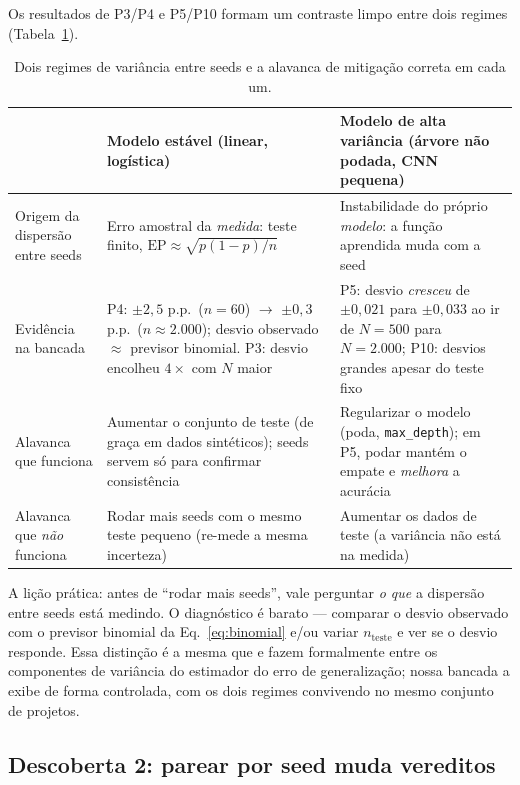 \documentclass[12pt]{article}
\begin{document}
Os resultados de P3/P4 e P5/P10 formam um contraste limpo entre dois regimes
(Tabela~\ref{tab:regimes}).

\begin{table}[htb]
\centering
\caption{Dois regimes de variância entre seeds e a alavanca de mitigação
correta em cada um.}
\label{tab:regimes}
\begin{tabular}{p{}p{}p{}}
\toprule
 & \textbf{Modelo estável} (linear, logística) & \textbf{Modelo de alta
variância} (árvore não podada, CNN pequena) \\
\midrule
Origem da dispersão entre seeds & Erro amostral da \emph{medida}: teste
finito, $\mathrm{EP} \approx \sqrt{p(1-p)/n}$ & Instabilidade do próprio
\emph{modelo}: a função aprendida muda com a seed \\
Evidência na bancada & P4: $\pm 2{,}5$ p.p.\ ($n{=}60$) $\to$ $\pm 0{,}3$
p.p.\ ($n{\approx}2.000$); desvio observado $\approx$ previsor binomial.
P3: desvio encolheu $4\times$ com $N$ maior & P5: desvio \emph{cresceu} de
$\pm 0{,}021$ para $\pm 0{,}033$ ao ir de $N{=}500$ para $N{=}2.000$;
P10: desvios grandes apesar do teste fixo \\
Alavanca que funciona & Aumentar o conjunto de teste (de graça em dados
sintéticos); seeds servem só para confirmar consistência & Regularizar o
modelo (poda, \texttt{max\_depth}); em P5, podar mantém o empate e
\emph{melhora} a acurácia \\
Alavanca que \emph{não} funciona & Rodar mais seeds com o mesmo teste pequeno
(re-mede a mesma incerteza) & Aumentar os dados de teste (a variância não
está na medida) \\
\bottomrule
\end{tabular}
\end{table}

A lição prática: antes de ``rodar mais seeds'', vale perguntar \emph{o que} a
dispersão entre seeds está medindo. O diagnóstico é barato --- comparar o
desvio observado com o previsor binomial da Eq.~\eqref{eq:binomial} e/ou
variar $n_{\text{teste}}$ e ver se o desvio responde. Essa distinção é a
mesma que \cite{nadeau2003} e \cite{bouthillier2021} fazem formalmente entre
os componentes de variância do estimador do erro de generalização; nossa
bancada a exibe de forma controlada, com os dois regimes convivendo no mesmo
conjunto de projetos.

\subsection{Descoberta 2: parear por seed muda vereditos}
\label{sec:ana-pareado}
\end{document}
